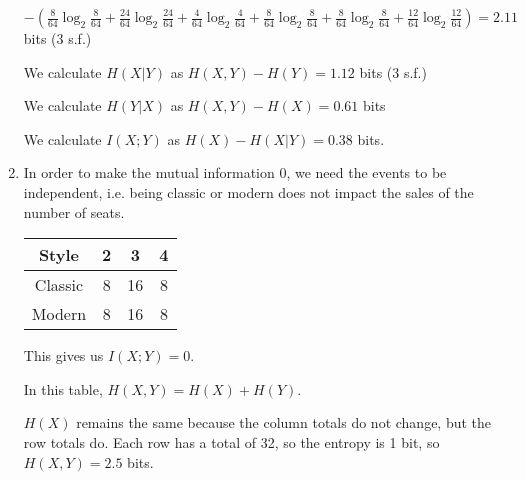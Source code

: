 \begin{enumerate}[label=(\alph*)]
    $-(\frac{8}{64}\log_2 \frac{8}{64} + \frac{24}{64}\log_2 \frac{24}{64} + \frac{4}{64}\log_2 \frac{4}{64} + \frac{8}{64}\log_2 \frac{8}{64} + \frac{8}{64}\log_2 \frac{8}{64} + \frac{12}{64}\log_2 \frac{12}{64}) = 2.11$ bits (3 s.f.)

    We calculate $H(X|Y)$ as $H(X,Y) - H(Y) = 1.12$ bits (3 s.f.)

    We calculate $H(Y|X)$ as $H(X,Y) - H(X) = 0.61$ bits 

    We calculate $I(X;Y)$ as $H(X) - H(X|Y)  = 0.38$ bits.

  \item
    In order to make the mutual information 0, we need the events to be independent, i.e. being classic or modern does not impact the sales of the number of seats.

    \begin{tabular}{c|ccc}
      Style&2&3&4\\
      \hline
      Classic&8&16&8\\
      Modern&8&16&8
    \end{tabular}

    This gives us $I(X;Y) = 0$.

    In this table, $H(X,Y) = H(X) + H(Y)$.

    $H(X)$ remains the same because the column totals do not change, but the row totals do. Each row has a total of 32, so the entropy is 1 bit, so $H(X,Y) = 2.5$ bits.
    


        
    \end{enumerate}

